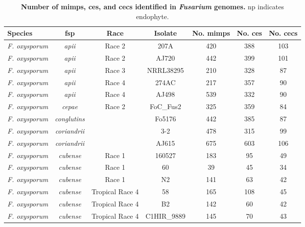 
\begingroup
\setlength{\tabcolsep}{6.1pt} %
\renewcommand{\arraystretch}{0.62}
\setlength\LTcapwidth{\textwidth} %
\setlength\LTleft{0pt}            %
\setlength\LTright{0pt} %
\footnotesize
\begin{longtable}{@{}lcccccc@{}}
\caption[Number of \acp{mimp}, \aclp{ce}, and \aclp{cec} identified in \textit{Fusarium} genomes.]{\textbf{Number of \acfp{mimp}, \acfp{ce}, and \acfp{cec} identified in \textit{Fusarium} genomes.} np indicates endophyte.}
\label{tab:CandEffNo}\\
\toprule
\textbf{Species} & \textbf{\acl{fsp}} & \textbf{Race} & \textbf{Isolate} & \textbf{No. \acp{mimp}} & \textbf{No. \acp{ce}} & \textbf{No. \acp{cec}} \\* \midrule
\endhead
%
\bottomrule
\endfoot
%
\endlastfoot
%
\textit{F. oxysporum} & \textit{apii} & Race 2 & 207A & 420 & 388 & 103 \\
\textit{F. oxysporum} & \textit{apii} & Race 2 & AJ720 & 442 & 399 & 101 \\
\textit{F. oxysporum} & \textit{apii} & Race 3 & NRRL38295 & 210 & 328 & 87 \\
\textit{F. oxysporum} & \textit{apii} & Race 4 & 274AC & 217 & 357 & 90 \\
\textit{F. oxysporum} & \textit{apii} & Race 4 & AJ498 & 539 & 332 & 90 \\
\textit{F. oxysporum} & \textit{cepae} & Race 2 & FoC\_Fus2 & 325 & 359 & 84 \\
\textit{F. oxysporum} & \textit{conglutins} &  & Fo5176 & 442 & 385 & 87 \\
\textit{F. oxysporum} & \textit{coriandrii} &  & 3-2 & 478 & 315 & 99 \\
\textit{F. oxysporum} & \textit{coriandrii} &  & AJ615 & 675 & 603 & 106 \\
\textit{F. oxysporum} & \textit{cubense} & Race 1 & 160527 & 183 & 95 & 49 \\
\textit{F. oxysporum} & \textit{cubense} & Race 1 & 60 & 39 & 45 & 34 \\
\textit{F. oxysporum} & \textit{cubense} & Race 1 & N2 & 141 & 63 & 42 \\
\textit{F. oxysporum} & \textit{cubense} & Tropical Race 4 & 58 & 165 & 108 & 45 \\
\textit{F. oxysporum} & \textit{cubense} & Tropical Race 4 & B2 & 142 & 60 & 42 \\
\textit{F. oxysporum} & \textit{cubense} & Tropical Race 4 & C1HIR\_9889 & 145 & 70 & 43 \\

\end{longtable}

